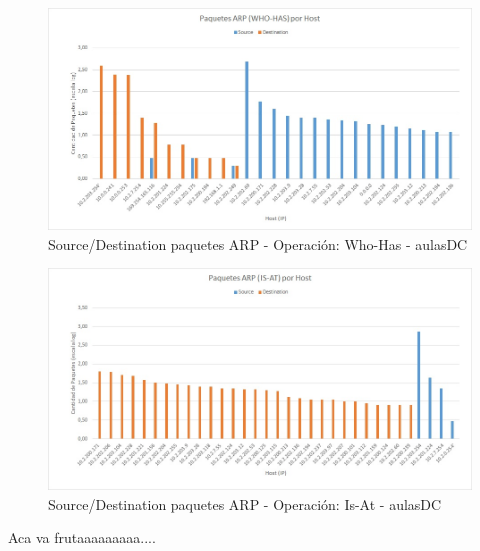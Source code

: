 \begin{figure}[h!]
\centering
\includegraphics[scale=0.7]{./img/arp_whoHas_aulasDC.jpg}
\caption{Source/Destination paquetes ARP - Operación: Who-Has - aulasDC}
\end{figure}

\begin{figure}[h!]
\centering
\includegraphics[scale=0.7]{./img/arp_isAt_aulasDC.jpg}
\caption{Source/Destination paquetes ARP - Operación: Is-At - aulasDC}
\end{figure}

Aca va frutaaaaaaaaa....